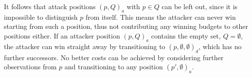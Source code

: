 It follows that attack positions ${(p, Q)}_a$ with $p \in Q$ can be left out,
since it is impossible to distinguish $p$ from itself.
This means the attacker can never win starting from such a position,
thus not contributing any winning budgets to other positions either.
If an attacker position ${(p, Q)}_a$ contains the empty set, $Q = \emptyset$,
the attacker can win straight away by transitioning to
${(p, \emptyset, \emptyset)}_d$, which has no further successors.
No better costs can be achieved by considering further observations from $p$
and transitioning to any position ${(p', \emptyset)}_a$.
